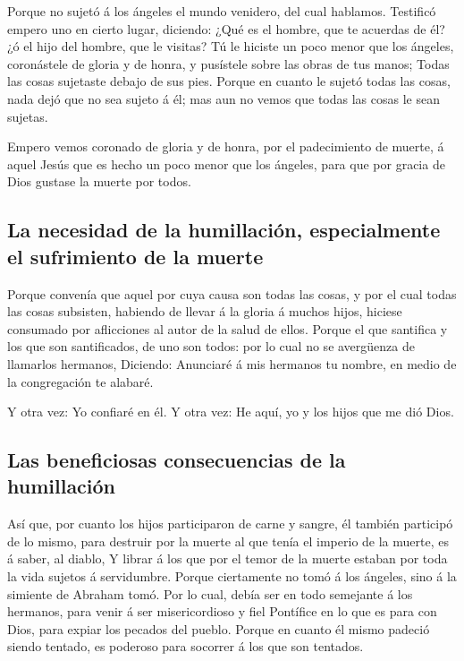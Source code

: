  Porque no sujetó á los ángeles el mundo venidero, del
cual hablamos.  Testificó empero uno en cierto lugar,
diciendo: ¿Qué es el hombre, que te acuerdas de él? ¿ó el hijo del
hombre, que le visitas?  Tú le hiciste un poco menor que
los ángeles, coronástele de gloria y de honra, y pusístele sobre las
obras de tus manos;  Todas las cosas sujetaste debajo de
sus pies. Porque en cuanto le sujetó todas las cosas, nada dejó que no
sea sujeto á él; mas aun no vemos que todas las cosas le sean sujetas.

 Empero vemos coronado de gloria y de honra, por el
padecimiento de muerte, á aquel Jesús que es hecho un poco menor que los
ángeles, para que por gracia de Dios gustase la muerte por todos.

\hypertarget{la-necesidad-de-la-humillaciuxf3n-especialmente-el-sufrimiento-de-la-muerte}{%
\subsection{La necesidad de la humillación, especialmente el sufrimiento
de la
muerte}\label{la-necesidad-de-la-humillaciuxf3n-especialmente-el-sufrimiento-de-la-muerte}}

 Porque convenía que aquel por cuya causa son todas las
cosas, y por el cual todas las cosas subsisten, habiendo de llevar á la
gloria á muchos hijos, hiciese consumado por aflicciones al autor de la
salud de ellos.  Porque el que santifica y los que son
santificados, de uno son todos: por lo cual no se avergüenza de
llamarlos hermanos,  Diciendo: Anunciaré á mis hermanos
tu nombre, en medio de la congregación te alabaré.

 Y otra vez: Yo confiaré en él. Y otra vez: He aquí, yo y
los hijos que me dió Dios.

\hypertarget{las-beneficiosas-consecuencias-de-la-humillaciuxf3n}{%
\subsection{Las beneficiosas consecuencias de la
humillación}\label{las-beneficiosas-consecuencias-de-la-humillaciuxf3n}}

 Así que, por cuanto los hijos participaron de carne y
sangre, él también participó de lo mismo, para destruir por la muerte al
que tenía el imperio de la muerte, es á saber, al diablo,
 Y librar á los que por el temor de la muerte estaban por
toda la vida sujetos á servidumbre.  Porque ciertamente
no tomó á los ángeles, sino á la simiente de Abraham tomó.
 Por lo cual, debía ser en todo semejante á los hermanos,
para venir á ser misericordioso y fiel Pontífice en lo que es para con
Dios, para expiar los pecados del pueblo.  Porque en
cuanto él mismo padeció siendo tentado, es poderoso para socorrer á los
que son tentados.

